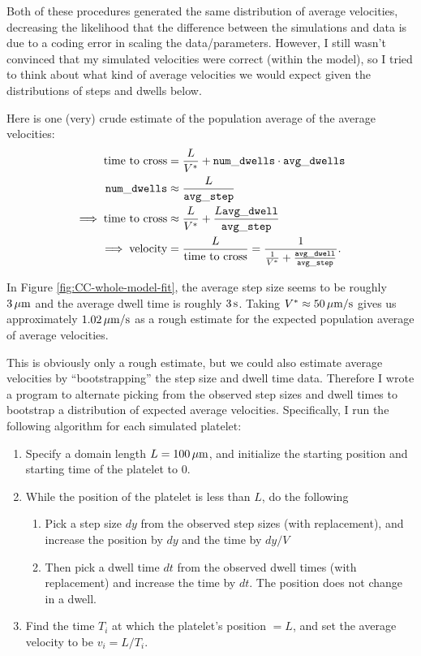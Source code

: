 \documentclass{article}
\newcommand{\tn}{\textnormal}
\begin{document}
Both of these procedures generated the same distribution of average
velocities, decreasing the likelihood that the difference between the
simulations and data is due to a coding error in scaling the
data/parameters. However, I still wasn't convinced that my simulated
velocities were correct (within the model), so I tried to think about
what kind of average velocities we would expect given the
distributions of steps and dwells below.

Here is one (very) crude estimate of the population average of the
average velocities:
\begin{align*}
  \tn{time to cross} &= \frac{L}{V^*} + \mathtt{num\_dwells} \cdot
                       \mathtt{avg\_dwells} \\
  \mathtt{num\_dwells} &\approx \frac{L}{\mathtt{avg\_step}} \\
  \implies \tn{time to cross} &\approx \frac{L}{V^*} + \frac{L
                                \mathtt{avg\_dwell}}{\mathtt{avg\_step}}
  \\
  \implies \tn{velocity} &= \frac{L}{\tn{time to cross}} =
                           \frac{1}{\frac{1}{V^*} +
                           \frac{\mathtt{avg\_dwell}}{\mathtt{avg\_step}}}.
\end{align*}

In Figure \ref{fig:CC-whole-model-fit}, the average step size seems to
be roughly $3 \,\mu\tn{m}$ and the average dwell time is roughly
$3 \,\tn{s}$. Taking $V^* \approx 50 \, \mu\tn{m}/\tn{s}$ gives us
approximately $1.02 \, \mu\tn{m}/\tn{s}$ as a rough estimate for the
expected population average of average velocities.

This is obviously only a rough estimate, but we could also estimate
average velocities by ``bootstrapping'' the step size and dwell time
data. Therefore I wrote a program to alternate picking from the
observed step sizes and dwell times to bootstrap a distribution of
expected average velocities. Specifically, I run the following
algorithm for each simulated platelet:
\begin{enumerate}
\item Specify a domain length $L = 100 \, \mu\tn{m}$, and initialize
  the starting position and starting time of the platelet to $0$.
\item While the position of the platelet is less than $L$, do the
  following
  \begin{enumerate}
  \item Pick a step size $dy$ from the observed step sizes (with
    replacement), and increase the position by $dy$ and the time by
    $dy / V$
  \item Then pick a dwell time $dt$ from the observed dwell times
    (with replacement) and increase the time by $dt$. The position
    does not change in a dwell.
  \end{enumerate}
\item Find the time $T_i$ at which the platelet's position $= L$, and
  set the average velocity to be $v_i = L/T_i$.
\end{enumerate}
\end{document}
